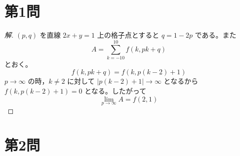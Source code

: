 \documentclass[../main.tex]{subfiles}
\begin{document}
\section*{第1問}

\begin{proof}[解]
  $(p, q)$ を直線 $2x+y=1$ 上の格子点とすると $q = 1-2p$ である。また
  \[
    A = \sum_{k=-10}^{10} f(k, pk+q)
  \]
  とおく。
  \[
    f(k, pk+q) = f(k, p(k-2)+1)
  \]
  $p \to \infty$ の時，$k \neq 2$ に対して $|p(k-2)+1| \to \infty$ となるから $f(k, p(k-2)+1) = 0$ となる。したがって
  \[
    \lim_{p \to \infty} A = f(2, 1)
  \]
\end{proof}

\newpage

\section*{第2問}
\end{document}

